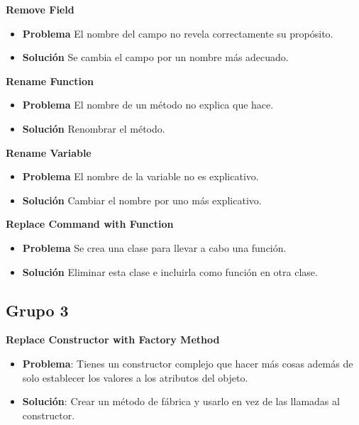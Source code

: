 \documentclass[11pt,a4paper,oneside]{book}
\begin{document}
\textbf{Remove Field}
\label{RenameField}
\begin{itemize}
    \item \textbf{Problema} El nombre del campo no revela correctamente su propósito.
    
    \item \textbf{Solución} Se cambia el campo por un nombre más adecuado.
    
\end{itemize}

\textbf{Rename Function}
\label{RenameFunction}
\begin{itemize}
    \item \textbf{Problema} El nombre de un método no explica que hace.
    
    \item \textbf{Solución} Renombrar el método.
    
\end{itemize}

\textbf{Rename Variable}
\label{RenameVariable}
\begin{itemize}
    \item \textbf{Problema} El nombre de la variable no es explicativo.
    
    \item \textbf{Solución} Cambiar el nombre por uno más explicativo.
    
\end{itemize}

\textbf{Replace Command with Function}
\label{ReplaceCommandWithFunction}
\begin{itemize}
    \item \textbf{Problema} Se crea una clase para llevar a cabo una función.
    
    \item \textbf{Solución} Eliminar esta clase e incluirla como función en otra clase.
    
\end{itemize}


\subsection{Grupo 3}
\textbf{Replace Constructor with Factory Method}
\label{replacerConstructorWithFactoryMethod}
\begin{itemize}
    \item \textbf{Problema}: Tienes un constructor complejo que hacer más cosas además de solo establecer los valores a los atributos del objeto.
    
    \item \textbf{Solución}: Crear un método de fábrica y usarlo en vez de las llamadas al constructor.
    
\end{itemize}
\end{document}
